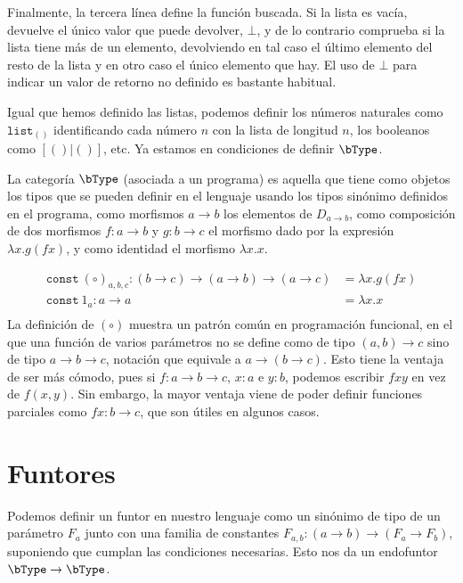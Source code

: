 Finalmente, la tercera línea define la función buscada. Si la lista es vacía,
devuelve el único valor que puede devolver, $\bot$, y de lo contrario comprueba
si la lista tiene más de un elemento, devolviendo en tal caso el último elemento
del resto de la lista y en otro caso el único elemento que hay. El uso de $\bot$
para indicar un valor de retorno no definido es bastante habitual.

Igual que hemos definido las listas, podemos definir los números naturales como
$\mathtt{list}_{()}$ identificando cada número $n$ con la lista de longitud $n$,
los booleanos como $[()|()]$, etc. Ya estamos en condiciones de definir
$\bType$.

\begin{definition}
  La categoría $\bType$ (asociada a un programa) es aquella que tiene como
  objetos los tipos que se pueden definir en el lenguaje usando los tipos
  sinónimo definidos en el programa, como morfismos $a\to b$ los elementos de
  $D_{a\to b}$, como composición de dos morfismos $f:a\to b$ y $g:b\to c$ el
  morfismo dado por la expresión $\lambda x.g(fx)$, y como identidad el morfismo
  $\lambda x.x$.
\end{definition}
\begin{align*}
  \mathtt{const\ }(\circ)_{a,b,c}:(b\to c)\to(a\to b)\to(a\to c) & = \lambda x.g(fx)\\
  \mathtt{const\ }1_a:a\to a & = \lambda x.x\\
\end{align*}
La definición de $(\circ)$ muestra un patrón común en programación funcional, en
el que una función de varios parámetros no se define como de tipo $(a,b)\to c$
sino de tipo $a\to b\to c$, notación que equivale a $a\to(b\to c)$. Esto tiene
la ventaja de ser más cómodo, pues si $f:a\to b\to c$, $x:a$ e $y:b$, podemos
escribir $fxy$ en vez de $f(x,y)$. Sin embargo, la mayor ventaja viene de
poder definir funciones parciales como $fx:b\to c$, que son útiles en algunos
casos.

\section{Funtores}

Podemos definir un funtor en nuestro lenguaje como un sinónimo de tipo de un
parámetro $F_a$ junto con una familia de constantes
$F_{a,b}:(a\to b)\to(F_a\to F_b)$, suponiendo que cumplan las condiciones
necesarias. Esto nos da un endofuntor $\bType\to\bType$.

